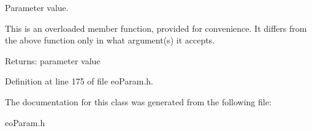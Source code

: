 Parameter value. 

This is an overloaded member function, provided for convenience. It differs from the above function only in what argument(s) it accepts.

\begin{Desc}
\item[Returns:]parameter value \end{Desc}


Definition at line 175 of file eo\-Param.h.

The documentation for this class was generated from the following file:\begin{CompactItemize}
\item 
eo\-Param.h\end{CompactItemize}
